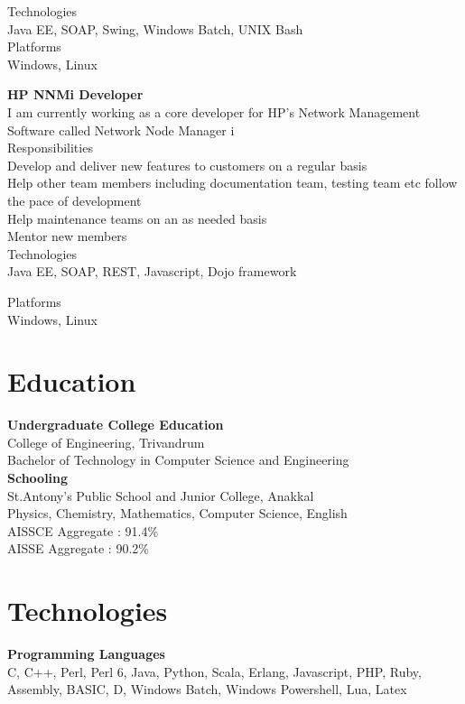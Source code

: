 \documentclass[line,margin]{res}
\begin{document}
\begin{resume}
Technologies\\
Java EE, SOAP, Swing, Windows Batch, UNIX Bash\\

Platforms\\
Windows, Linux

{\bf HP NNMi Developer}\\
I am currently working as a core developer for HP's Network Management Software called Network Node Manager i\\

Responsibilities\\
Develop and deliver new features to customers on a regular basis\\
Help other team members including documentation team, testing team etc follow the pace of development\\
Help maintenance teams on an as needed basis\\
Mentor new members\\

Technologies\\
Java EE, SOAP, REST, Javascript, Dojo framework

Platforms\\
Windows, Linux

\section{Education}

{\bf Undergraduate College Education}\\
College of Engineering, Trivandrum\\
Bachelor of Technology in Computer Science and Engineering\\

{\bf Schooling} \\
St.Antony's Public School and Junior College, Anakkal\\
Physics, Chemistry, Mathematics, Computer Science, English\\

AISSCE Aggregate : 91.4\%\\
AISSE Aggregate : 90.2\%\\

\section{Technologies}

{\bf Programming Languages}\\
C, C++, Perl, Perl 6, Java, Python, Scala, Erlang, Javascript, PHP, Ruby, Assembly, BASIC, D, Windows Batch, Windows Powershell, Lua, Latex


\end{resume}
\end{document}
